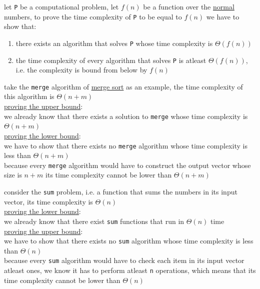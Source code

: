 \documentclass[a4paper,12pt]{article}
\newcommand{\?}{\stackrel{?}{=}}
\begin{document}
\begin{lemma}
let \texttt{P} be a computational problem, let \(f(n)\) be a function over the \href{calculus2.org}{normal} numbers, to prove the time complexity of \texttt{P} to be equal to \(f(n)\) we have to show that:\\[0pt]
\begin{enumerate}
\item there exists an algorithm that solves \texttt{P} whose time complexity is \(\Theta(f(n))\)\\[0pt]
\item the time complexity of every algorithm that solves \texttt{P} is atleast \(\Theta(f(n))\), i.e. the complexity is bound from below by \(f(n)\)\\[0pt]
\end{enumerate}
\begin{my_example}
take the \texttt{merge} algorithm of \href{20230204143850-merge_sort.org}{merge sort} as an example, the time complexity of this algorithm is \(\Theta(n+m)\)\\[0pt]
\uline{proving the upper bound}:\\[0pt]
we already know that there exists a solution to \texttt{merge} whose time complexity is \(\Theta(n+m)\)\\[0pt]
\uline{proving the lower bound}:\\[0pt]
we have to show that there exists no \texttt{merge} algorithm whose time complexity is less than \(\Theta(n+m)\)\\[0pt]
because every \texttt{merge} algorithm would have to construct the output vector whose size is \(n+m\) its time complexity cannot be lower than \(\Theta(n+m)\)\\[0pt]
\end{my_example}
\begin{my_example}
consider the \texttt{sum} problem, i.e. a function that sums the numbers in its input vector, its time complexity is \(\Theta(n)\)\\[0pt]
\uline{proving the lower bound}:\\[0pt]
we already know that there exist \texttt{sum} functions that run in \(\Theta(n)\) time\\[0pt]
\uline{proving the upper bound}:\\[0pt]
we have to show that there exists no \texttt{sum} algorithm whose time complexity is less than \(\Theta(n)\)\\[0pt]
because every \texttt{sum} algorithm would have to check each item in its input vector atleast ones, we know it has to perform atleast \texttt{n} operations, which means that its time complexity cannot be lower than \(\Theta(n)\)\\[0pt]
\end{my_example}
\end{lemma}
\end{document}
